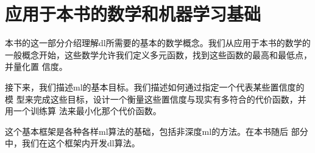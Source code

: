 
\part{应用于本书的数学和机器学习基础}
\label{part_basics}

本书的这一部分介绍理解\gls*{dl}所需要的基本的数学概念。我们从应用于本书的数学的
一般概念开始，这些数学允许我们定义多元函数，找到这些函数的最高和最低点，并量化置
信度。

接下来，我们描述\gls*{ml}的基本目标。我们描述如何通过指定一个代表某些置信度的模
型来完成这些目标，设计一个衡量这些置信度与现实有多符合的代价函数，并用一个训练算
法来最小化那个代价函数。

这个基本框架是各种各样\gls*{ml}算法的基础，包括非深度\gls*{ml}的方法。在本书随后
部分中，我们在这个框架内开发\gls*{dl}算法。
